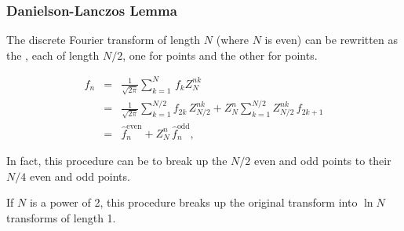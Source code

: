\documentclass[hyperref={colorlinks=true}]{beamer}
\begin{document}
\begin{frame}%
  \frametitle{Danielson-Lanczos Lemma}
  
  The discrete Fourier transform of length $N$ (where $N$ is even) can be rewritten as the , each of length $N/2$, one for  points and the other for  points. 
      
  \begin{eqnarray}
    \hat{f}_n	&=&	\frac{1}{\sqrt{2\pi}} \sum_{k=1}^{N} \, f_k  Z_{N}^{nk}	\\
	            &=& \frac{1}{\sqrt{2\pi}} \sum_{k=1}^{N/2} f_{2k} \,  Z_{N/2}^{nk} + Z_N^n \sum_{k=1}^{N/2} Z_{N/2}^{nk} \, f_{2k+1}	\\
	            &=& \hat{f}_n^{\mathrm{even}} + Z_N^n \, \hat{f}_n^{\mathrm{odd}},	
  \end{eqnarray}

  In fact, this procedure can be  to break up the $N/2$ even and odd points to their $N/4$ even and odd points. 
  
  \mysp
  
  If $N$ is a power of 2, this procedure breaks up the original transform into $\ln N$ transforms of length 1.
  
\end{frame}  
  
\end{document}

